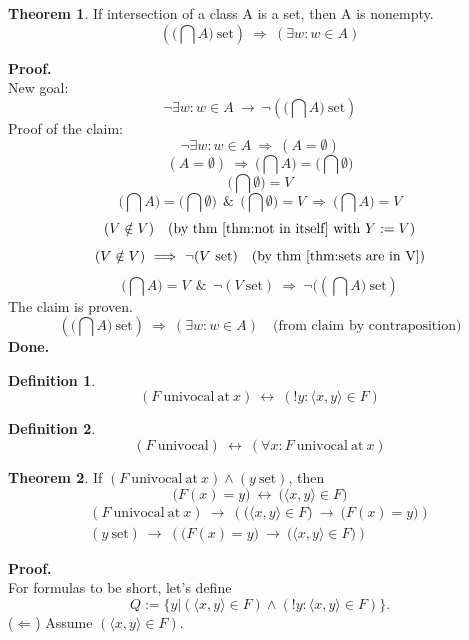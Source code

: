 \documentclass[10pt,a4paper]{article}
\theoremstyle{definition}
\newtheorem{definition}{Definition}[section]
\newtheorem{theorem}{Theorem}[section]
\newcommand{\AND}{\ \ \&\ \ }
\newcommand{\Done}{\noindent \textbf{Done.}\\}
\renewcommand{\iff}{\ \longleftrightarrow\ }
\newcommand{\IMPLIES}{\ \Longrightarrow\ }
\renewcommand{\implies}{\ \longrightarrow\ }
\newcommand{\intersection}{\bigcap}
\newcommand{\Proof}{\noindent \textbf{Proof.}\\}
\newcommand{\set}{\mathrm{\ set}}
\newcommand{\univocal}{\mathrm{\ univocal}}
\newcommand{\univocalat}{\mathrm{\ univocal\ at\ }}
\begin{document}
\begin{theorem}
\label{thm:intersection set then}
If intersection of a class A is a set, then A is nonempty. 
\[
(\big(\intersection A\big)\set)
\IMPLIES
(\exists w: w\in A)
\]
\end{theorem}
\Proof
New goal:
\[
\neg\exists w: w\in A
\implies
\neg(\big(\intersection A\big)\set)
\]
Proof of the claim:
\[
\neg\exists w: w\in A
\IMPLIES
(A=\emptyset)
\]
\[
(A=\emptyset)
\IMPLIES
(\intersection A\big) = (\intersection \emptyset\big)
\]
\[
(\intersection \emptyset\big) = V
\]
\[
(\intersection A\big) = (\intersection \emptyset\big)
\AND
(\intersection \emptyset\big) = V
\IMPLIES
(\intersection A\big) = V
\]
\[
(V\notin V)
\quad\mbox{(by thm \ref{thm:not in itself} with $Y:=V$)}
\]
\[
(V\notin V)
\IMPLIES
\neg(V\set)
\quad\mbox{(by thm \ref{thm:sets are in V})}
\]
\[
(\intersection A\big) = V
\AND
\neg(V\set)
\IMPLIES
\neg((\intersection A\big) \set)
\]
The claim is proven.
\[
(\big(\intersection A\big)\set)
\IMPLIES
(\exists w: w\in A)
\quad\mbox{(from claim by contraposition)}
\]
\Done
\begin{definition}
\label{def:univocalat}
\[
(F\univocalat x)\iff(!y : \langle x,y\rangle \in F)
\]
\end{definition}
\begin{definition}
\label{def:univocal}
\[
(F\univocal)\iff (\forall x: F\univocalat x)
\]
\end{definition}
\begin{theorem}
\label{thm:pair in function}
If $(F\univocalat x)\land(y\set)$, then
\[
\big(F(x)=y\big)\iff\big(\langle x,y\rangle\in F\big)
\]
\begin{align*}
(F\univocalat x)
\implies
\left(
\big(\langle x,y\rangle\in F\big)
\implies
\big(F(x)=y\big)
\right)
\\
(y\set)
\implies
\left(
\big(F(x)=y\big)
\implies
\big(\langle x,y\rangle\in F\big)
\right)
\end{align*}
\iffalse
\[
\mbox{x set!!??}
(F\univocalat x)
\implies
\left(
\left(
\big(F(x)=y\big)\land(y\set)
\right)
\iff\big(\langle x,y\rangle\in F\big)
\right)
\]
\fi
\end{theorem}
\Proof
For formulas to be short, let's define 
\[
Q:=\{y| (\langle x,y\rangle\in F) \land (!y: \langle x,y\rangle\in F)\}.
\]
\noindent($\Leftarrow$) Assume $(\langle x,y\rangle\in F)$.
\end{document}
